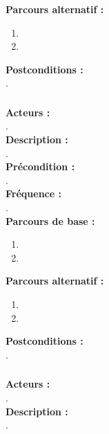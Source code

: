 \documentclass[../rapport.tex]{subfiles}
\begin{document}
\textbf{Parcours alternatif :}
\begin{enumerate}
    \item 
    \item 
\end{enumerate}

\textbf{Postconditions :} \\
. \\



\subsubsection{}

\textbf{Acteurs :} \\
. \\

\textbf{Description :} \\
. \\

\textbf{Précondition :} \\
. \\

\textbf{Fréquence :} \\
. \\

\textbf{Parcours de base :} \\
\begin{enumerate}
    \item 
    \item 
\end{enumerate}
\bigskip

\textbf{Parcours alternatif :}
\begin{enumerate}
    \item 
    \item 
\end{enumerate}

\textbf{Postconditions :} \\
. \\



\subsubsection{}

\textbf{Acteurs :} \\
. \\

\textbf{Description :} \\
. \\
\end{document}
